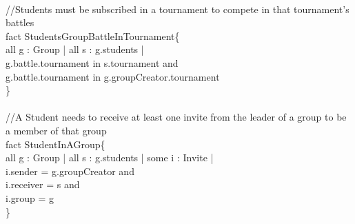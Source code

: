 \documentclass{article}
\begin{document}
{\\
\color{gray}
//Students must be subscribed in a tournament to compete in that tournament's battles\\
\color{black}
\color{blue} fact \color{black} StudentsGroupBattleInTournament\{\\
\-\hspace{1cm} \color{blue} all \color{black} g : Group | \color{blue} all \color{black} s : g.students | \\
\-\hspace{1cm} g.battle.tournament \color{blue} in \color{black} s.tournament and \\
\-\hspace{1cm} g.battle.tournament \color{blue} in \color{black} g.groupCreator.tournament\\
\}\\
\\
\color{gray}
//A Student needs to receive at least one invite from the leader of a group to be a member of that group\\
\color{black}
\color{blue} fact \color{black} StudentInAGroup\{\\
\-\hspace{1cm} \color{blue} all \color{black} g : Group | \color{blue} all \color{black} s : g.students | \color{blue} some \color{black} i : Invite |\\
\-\hspace{1cm} i.sender \color{blue} = \color{black} g.groupCreator and\\
\-\hspace{1cm} i.receiver \color{blue} = \color{black} s  and \\
\-\hspace{1cm} i.group \color{blue} = \color{black} g\\
\}\\
}
\end{document}
